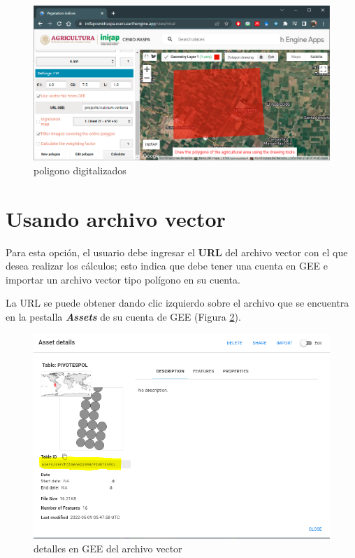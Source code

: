 \documentclass[
]{book}
\begin{document}
\begin{figure}

{\centering \includegraphics[width=0.75\linewidth]{./images/Figure13} 

}

\caption{poligono digitalizados}\label{fig:figG11}
\end{figure}

\hypertarget{usando-archivo-vector}{%
\section{Usando archivo vector}\label{usando-archivo-vector}}

Para esta opción, el usuario debe ingresar el \textbf{URL} del archivo vector con el que desea realizar los cálculos; esto indica que debe tener una cuenta en GEE e importar un archivo vector tipo polígono en su cuenta.

La URL se puede obtener dando clic izquierdo sobre el archivo que se encuentra en la pestalla \emph{\textbf{Assets}} de su cuenta de GEE (Figura \ref{fig:figG12}).

\begin{figure}

{\centering \includegraphics[width=0.75\linewidth]{./images/Figure14} 

}

\caption{detalles en GEE del archivo vector}\label{fig:figG12}
\end{figure}
\end{document}
